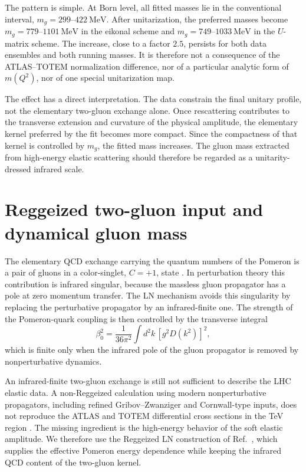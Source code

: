 \documentclass[aps,prd,twocolumn,superscriptaddress,longbibliography,nofootinbib]{revtex4-2}
\newcommand{\MeV}{\mathrm{MeV}}
\begin{document}
The pattern is simple.  At Born level, all fitted masses lie in the conventional interval, $m_g=299$--$422~\MeV$.  After unitarization, the preferred masses become $m_g=779$--$1101~\MeV$ in the eikonal scheme and $m_g=749$--$1033~\MeV$ in the $U$-matrix scheme.  The increase, close to a factor $2.5$, persists for both data ensembles and both running masses.  It is therefore not a consequence of the ATLAS--TOTEM normalization difference, nor of a particular analytic form of $m(Q^2)$, nor of one special unitarization map.

The effect has a direct interpretation.  The data constrain the final unitary profile, not the elementary two-gluon exchange alone.  Once rescattering contributes to the transverse extension and curvature of the physical amplitude, the elementary kernel preferred by the fit becomes more compact.  Since the compactness of that kernel is controlled by $m_g$, the fitted mass increases.  The gluon mass extracted from high-energy elastic scattering should therefore be regarded as a unitarity-dressed infrared scale.


\section{Reggeized two-gluon input and dynamical gluon mass}
\label{sec:reggeized_input}

The elementary QCD exchange carrying the quantum numbers of the Pomeron is a pair of gluons in a color-singlet, $C=+1$, state \cite{Low1975,Nussinov1975,GunionSoper1977,LevinRyskin1981,LandshoffNachtmann1987}.  In perturbation theory this contribution is infrared singular, because the massless gluon propagator has a pole at zero momentum transfer.  The LN mechanism avoids this singularity by replacing the perturbative propagator by an infrared-finite one.  The strength of the Pomeron-quark coupling is then controlled by the transverse integral
\begin{equation}
\beta_0^2=
\frac{1}{36\pi^2}
\int d^2k\,
\left[g^2D(k^2)\right]^2,
\label{eq:beta0}
\end{equation}
which is finite only when the infrared pole of the gluon propagator is removed by nonperturbative dynamics.

An infrared-finite two-gluon exchange is still not sufficient to describe the LHC elastic data.  A non-Reggeized calculation using modern nonperturbative propagators, including refined Gribov--Zwanziger and Cornwall-type inputs, does not reproduce the ATLAS and TOTEM differential cross sections in the TeV region \cite{Canfora:2017}.  The missing ingredient is the high-energy behavior of the soft elastic amplitude.  We therefore use the Reggeized LN construction of Ref.~\cite{BopsinEtAl2023}, which supplies the effective Pomeron energy dependence while keeping the infrared QCD content of the two-gluon kernel.
\end{document}
